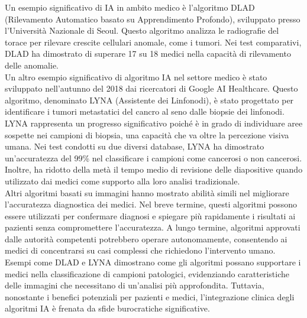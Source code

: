 Un esempio significativo di IA in ambito medico è l'algoritmo DLAD (Rilevamento Automatico basato su Apprendimento Profondo), sviluppato presso l'Università Nazionale di Seoul. Questo algoritmo analizza le radiografie del torace per rilevare crescite cellulari anomale, come i tumori. Nei test comparativi, DLAD ha dimostrato di superare 17 su 18 medici nella capacità di rilevamento delle anomalie.\\
Un altro esempio significativo di algoritmo IA nel settore medico è stato sviluppato nell'autunno del 2018 dai ricercatori di Google AI Healthcare. Questo algoritmo, denominato LYNA (Assistente dei Linfonodi), è stato progettato per identificare i tumori metastatici del cancro al seno dalle biopsie dei linfonodi. LYNA rappresenta un progresso significativo poiché è in grado di individuare aree sospette nei campioni di biopsia, una capacità che va oltre la percezione visiva umana. Nei test condotti su due diversi database, LYNA ha dimostrato un'accuratezza del 99\% nel classificare i campioni come cancerosi o non cancerosi. Inoltre, ha ridotto della metà il tempo medio di revisione delle diapositive quando utilizzato dai medici come supporto alla loro analisi tradizionale.\\
Altri algoritmi basati su immagini hanno mostrato abilità simili nel migliorare l'accuratezza diagnostica dei medici. Nel breve termine, questi algoritmi possono essere utilizzati per confermare diagnosi e spiegare più rapidamente i risultati ai pazienti senza compromettere l'accuratezza. A lungo termine, algoritmi approvati dalle autorità competenti potrebbero operare autonomamente, consentendo ai medici di concentrarsi su casi complessi che richiedono l'intervento umano.\\
Esempi come DLAD e LYNA dimostrano come gli algoritmi possano supportare i medici nella classificazione di campioni patologici, evidenziando caratteristiche delle immagini che necessitano di un'analisi più approfondita. Tuttavia, nonostante i benefici potenziali per pazienti e medici, l'integrazione clinica degli algoritmi IA è frenata da sfide burocratiche significative.\\

